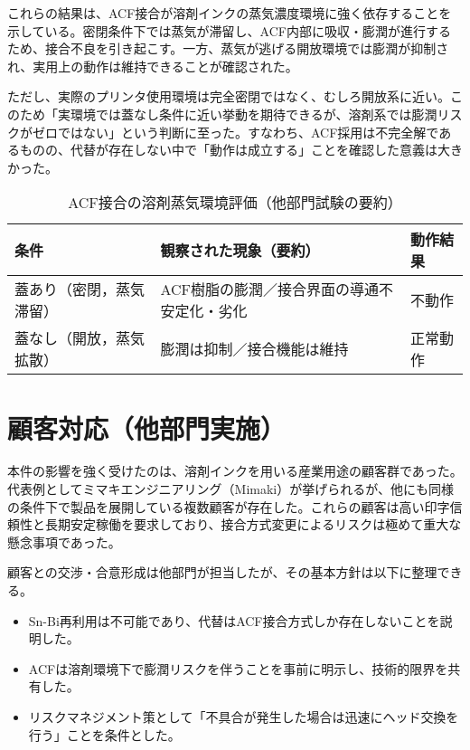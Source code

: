 \documentclass[conference]{IEEEtran}
\begin{document}
これらの結果は、ACF接合が溶剤インクの蒸気濃度環境に強く依存することを示している。密閉条件下では蒸気が滞留し、ACF内部に吸収・膨潤が進行するため、接合不良を引き起こす。一方、蒸気が逃げる開放環境では膨潤が抑制され、実用上の動作は維持できることが確認された。  

ただし、実際のプリンタ使用環境は完全密閉ではなく、むしろ開放系に近い。このため「実環境では蓋なし条件に近い挙動を期待できるが、溶剤系では膨潤リスクがゼロではない」という判断に至った。すなわち、ACF採用は不完全解であるものの、代替が存在しない中で「動作は成立する」ことを確認した意義は大きかった。

\begin{table}[t]
\centering
\footnotesize
\caption{ACF接合の溶剤蒸気環境評価（他部門試験の要約）}
\label{tab:solvent}
\renewcommand{\arraystretch}{1.1}
\begin{tabularx}{\columnwidth}{@{}p{2.2cm} Y p{1.9cm}@{}}
\toprule
条件 & 観察された現象（要約） & 動作結果 \\
\midrule
蓋あり（密閉，蒸気滞留） &
ACF樹脂の膨潤／接合界面の導通不安定化・劣化 &
不動作 \\
\addlinespace[2pt]
蓋なし（開放，蒸気拡散） &
膨潤は抑制／接合機能は維持 &
正常動作 \\
\bottomrule
\end{tabularx}
\end{table}

\section{顧客対応（他部門実施）}
本件の影響を強く受けたのは、溶剤インクを用いる産業用途の顧客群であった。代表例としてミマキエンジニアリング（Mimaki）が挙げられるが、他にも同様の条件下で製品を展開している複数顧客が存在した。これらの顧客は高い印字信頼性と長期安定稼働を要求しており、接合方式変更によるリスクは極めて重大な懸念事項であった。  

顧客との交渉・合意形成は他部門が担当したが、その基本方針は以下に整理できる。  

\begin{itemize}
 \item Sn-Bi再利用は不可能であり、代替はACF接合方式しか存在しないことを説明した。  
 \item ACFは溶剤環境下で膨潤リスクを伴うことを事前に明示し、技術的限界を共有した。  
 \item リスクマネジメント策として「不具合が発生した場合は迅速にヘッド交換を行う」ことを条件とした。  
\end{itemize}
\end{document}
